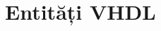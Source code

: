 \documentclass[../main.tex]{subfiles}
\begin{document}
\chapter{Entități VHDL} \label{appendix:entities}
\end{document}
